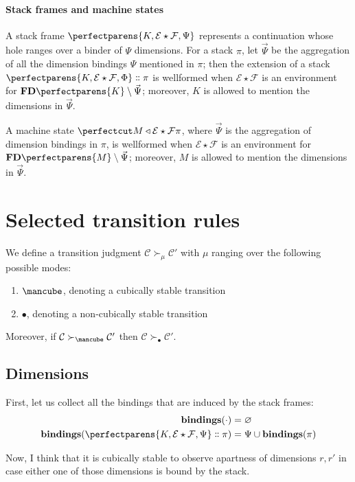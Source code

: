 \documentclass{article}
\newcommand\StackBindings[1]{\mathbf{bindings} (#1)}
\newcommand\Env[2]{#1\star{#2}}
\newcommand\Clo[3]{#1\triangleleft{\Env{#2}{#3}}}
\newcommand\Cons[2]{{#1}\dblcolon{#2}}
\newcommand\FreeDims[1]{\mathbf{FD}\perfectparens{#1}}
\newcommand\Frame[4]{\perfectparens{#1,\Env{#2}{#3},#4}}
\newcommand\Cfg[4]{\cut{\Clo{#1}{#2}{#3}}{#4}}
\newcommand\Stable{\text{\mancube}}
\newcommand\NonStable{\bullet}
\newcommand\Step[3]{{#2}\mathrel{\succ_{#1}}{#3}}
\newcommand\CC{\mathcal{C}}
\newcommand\EE{\mathcal{E}}
\newcommand\FF{\mathcal{F}}
\begin{document}
\paragraph{Stack frames and machine states}

A stack frame $\Frame{K}{\EE}{\FF}{\Psi}$ represents a continuation
whose hole ranges over a binder of $\Psi$ dimensions. For a stack
$\pi$, let $\vec{\Psi}$ be the aggregation of all the dimension
bindings $\Psi$ mentioned in $\pi$; then the extension of a stack
$\Cons{\Frame{K}{\EE}{\FF}{\Phi}}{\pi}$ is wellformed when
$\Env{\EE}{\FF}$ is an environment for $\FreeDims{K}\setminus\vec{\Psi}$;
moreover, $K$ is allowed to mention the dimensions in $\vec{\Psi}$.

A machine state $\Cfg{M}{\EE}{\FF}{\pi}$, where $\vec{\Psi}$ is the
aggregation of dimension bindings in $\pi$, is wellformed when
$\Env{\EE}{\FF}$ is an environment for $\FreeDims{M}\setminus\vec{\Psi}$;
moreover, $M$ is allowed to mention the dimensions in $\vec{\Psi}$.

\section{Selected transition rules}

We define a transition judgment
$\Step{\mu}{\CC}{\CC'}$ with $\mu$ ranging over
the following possible modes:
\begin{enumerate}
\item $\Stable$, denoting a cubically stable transition
\item $\NonStable$, denoting a non-cubically stable transition
\end{enumerate}

Moreover, if $\Step{\Stable}{\CC}{\CC'}$ then
$\Step{\NonStable}{\CC}{\CC'}$.

\subsection{Dimensions}

First, let us collect all the bindings that are induced by the stack
frames:
\begin{align*}
  \StackBindings{\cdot} &= \varnothing\\
  \StackBindings{\Cons{\Frame{K}{\EE}{\FF}{\Psi}}{\pi}} &= \Psi\cup\StackBindings{\pi}
\end{align*}

Now, I think that it is cubically stable to observe apartness of
dimensions $r,r'$ in case either one of those dimensions is bound by
the stack.
\end{document}
